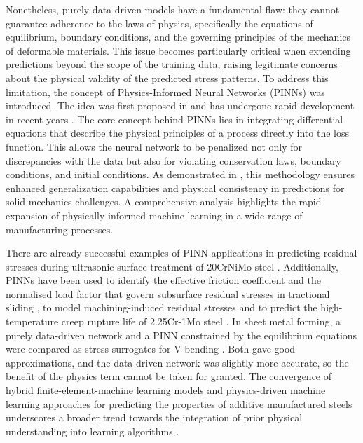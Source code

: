 \documentclass[pdflatex,sn-basic,Numbered]{sn-jnl}
\begin{document}
Nonetheless, purely data-driven models have a fundamental flaw: they cannot guarantee adherence to the laws of physics, specifically the equations of equilibrium, boundary conditions, and the governing principles of the mechanics of deformable materials. This issue becomes particularly critical when extending predictions beyond the scope of the training data, raising legitimate concerns about the physical validity of the predicted stress patterns.
To address this limitation, the concept of Physics-Informed Neural Networks (PINNs) was introduced. The idea was first proposed in \citep{raissi2019physics} and has undergone rapid development in recent years \citep{karniadakis2021physics}. The core concept behind PINNs lies in integrating differential equations that describe the physical principles of a process directly into the loss function. This allows the neural network to be penalized not only for discrepancies with the data but also for violating conservation laws, boundary conditions, and initial conditions.
As demonstrated in \citep{haghighat2021physics}, this methodology ensures enhanced generalization capabilities and physical consistency in predictions for solid mechanics challenges. A comprehensive analysis \citep{ra2026physics} highlights the rapid expansion of physically informed machine learning in a wide range of manufacturing processes.

There are already successful examples of PINN applications in predicting residual stresses during ultrasonic surface treatment of 20CrNiMo steel \citep{yang2025prediction}. Additionally, PINNs have been used to identify the effective friction coefficient and the normalised load factor that govern subsurface residual stresses in tractional sliding \citep{mehedihasan2026inverse}, to model machining-induced residual stresses \citep{hasan2025machining} and to predict the high-temperature creep rupture life of 2.25Cr-1Mo steel \citep{muransky2026application}. In sheet metal forming, a purely data-driven network and a PINN constrained by the equilibrium equations were compared as stress surrogates for V-bending \citep{munzone2024comparative}. Both gave good approximations, and the data-driven network was slightly more accurate, so the benefit of the physics term cannot be taken for granted. The convergence of hybrid finite-element-machine learning models and physics-driven machine learning approaches for predicting the properties of additive manufactured steels underscores a broader trend towards the integration of prior physical understanding into learning algorithms \citep{laakso2024hybrid, rahman2025physics}.
\end{document}

